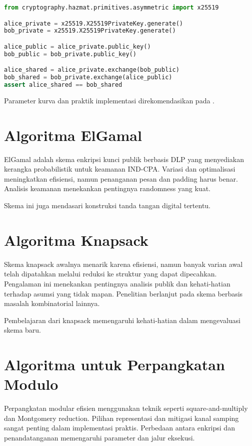 \documentclass[../main.tex]{subfiles}
\begin{document}
\begin{lstlisting}[language=Python, caption={ECDH X25519 di Python}, label={lst:x25519}]
from cryptography.hazmat.primitives.asymmetric import x25519

alice_private = x25519.X25519PrivateKey.generate()
bob_private = x25519.X25519PrivateKey.generate()

alice_public = alice_private.public_key()
bob_public = bob_private.public_key()

alice_shared = alice_private.exchange(bob_public)
bob_shared = bob_private.exchange(alice_public)
assert alice_shared == bob_shared
\end{lstlisting}

\noindent Parameter kurva dan praktik implementasi direkomendasikan pada \textcite{rfc7748,nist80056a}.

\section{Algoritma ElGamal}
ElGamal adalah skema enkripsi kunci publik berbasis DLP yang menyediakan kerangka probabilistik untuk keamanan IND-CPA. Variasi dan optimalisasi meningkatkan efisiensi, namun penanganan pesan dan padding harus benar. Analisis keamanan menekankan pentingnya randomness yang kuat.

Skema ini juga mendasari konstruksi tanda tangan digital tertentu.

\section{Algoritma Knapsack}
Skema knapsack awalnya menarik karena efisiensi, namun banyak varian awal telah dipatahkan melalui reduksi ke struktur yang dapat dipecahkan. Pengalaman ini menekankan pentingnya analisis publik dan kehati-hatian terhadap asumsi yang tidak mapan. Penelitian berlanjut pada skema berbasis masalah kombinatorial lainnya.

Pembelajaran dari knapsack memengaruhi kehati-hatian dalam mengevaluasi skema baru.

\section{Algoritma untuk Perpangkatan Modulo}
Perpangkatan modular efisien menggunakan teknik seperti square-and-multiply dan Montgomery reduction. Pilihan representasi dan mitigasi kanal samping sangat penting dalam implementasi praktis. Perbedaan antara enkripsi dan penandatanganan memengaruhi parameter dan jalur eksekusi.
\end{document}
